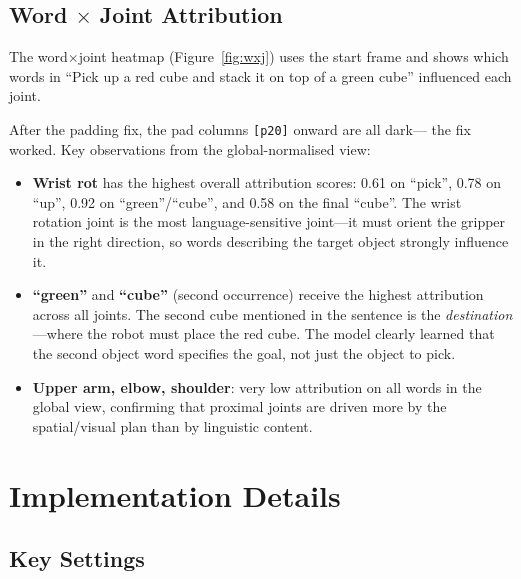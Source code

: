 \documentclass[11pt,a4paper]{article}
\begin{document}
\subsection{Word $\times$ Joint Attribution}

The word$\times$joint heatmap (Figure~\ref{fig:wxj}) uses the start frame
and shows which words in ``Pick up a red cube and stack it on top of a
green cube'' influenced each joint.

After the padding fix, the pad columns \texttt{[p20]} onward are all dark---
the fix worked. Key observations from the global-normalised view:

\begin{itemize}
    \item \textbf{Wrist rot} has the highest overall attribution scores:
          0.61 on ``pick'', 0.78 on ``up'', 0.92 on ``green''/``cube'',
          and 0.58 on the final ``cube''. The wrist rotation joint is the most
          language-sensitive joint---it must orient the gripper in the right
          direction, so words describing the target object strongly influence it.
    \item \textbf{``green''} and \textbf{``cube''} (second occurrence) receive
          the highest attribution across all joints. The second cube mentioned
          in the sentence is the \emph{destination}---where the robot must
          place the red cube. The model clearly learned that the second object
          word specifies the goal, not just the object to pick.
    \item \textbf{Upper arm, elbow, shoulder}: very low attribution on all words
          in the global view, confirming that proximal joints are driven more
          by the spatial/visual plan than by linguistic content.
\end{itemize}

\section{Implementation Details}

\subsection{Key Settings}
\end{document}
